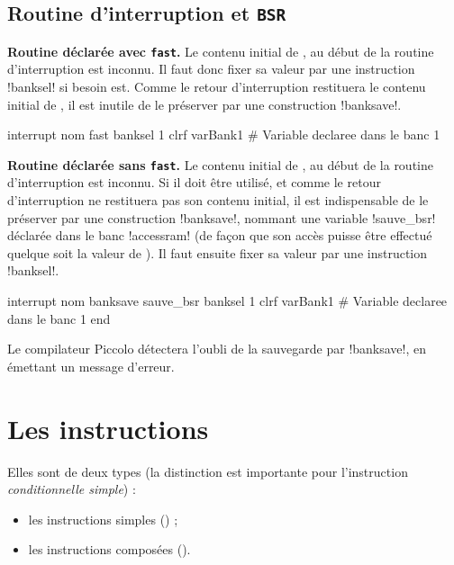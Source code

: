 \subsection{Routine d'interruption et \texttt{BSR}}

\textbf{Routine déclarée avec \texttt{fast}.} Le contenu initial de , au début de la routine d’interruption est inconnu. Il faut donc fixer sa valeur par une instruction \pic!banksel! si besoin est. Comme le retour d’interruption restituera le contenu initial de , il est inutile de le préserver par une construction \pic!banksave!.

\begin{piccolo}
interrupt nom fast {
  banksel 1
  clrf varBank1 #  Variable declaree dans le banc 1
}
\end{piccolo}

\textbf{Routine déclarée sans \texttt{fast}.} Le contenu initial de , au début de la routine d’interruption est inconnu. Si il doit être utilisé, et comme le retour d’interruption ne restituera pas son contenu initial, il est indispensable de le préserver par une construction \pic!banksave!, nommant une variable \pic!sauve_bsr! déclarée dans le banc \pic!accessram! (de façon que son accès puisse être effectué quelque soit la valeur de ). Il faut ensuite fixer sa valeur par une instruction \pic!banksel!. 

\begin{piccolo}
interrupt nom {
  banksave sauve_bsr
    banksel 1
    clrf varBank1 #  Variable declaree dans le banc 1
  end
}
\end{piccolo}

Le compilateur Piccolo détectera l’oubli de la sauvegarde par \pic!banksave!, en émettant un message d’erreur.


\section{Les instructions}

Elles sont de deux types (la distinction est importante pour l’instruction \emph{conditionnelle simple}) :
\begin{itemize}
  \item les instructions simples () ;
  \item les instructions composées ().

\end{itemize}


